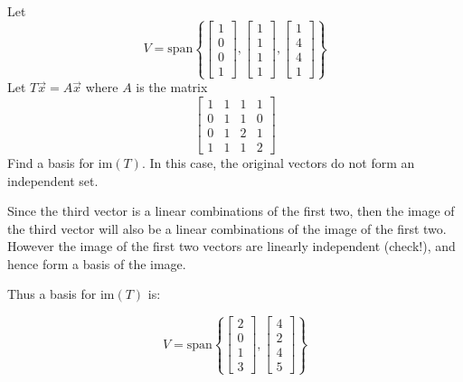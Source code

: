 \documentclass{ximera}
\begin{document}
\begin{problem}\label{prb:10.76} Let
\begin{equation*}
V=\mbox{span}\left\{ \left[
\begin{array}{c}
1 \\
0 \\
0 \\
1
\end{array}
\right] ,\left[
\begin{array}{c}
1 \\
1 \\
1 \\
1
\end{array}
\right] ,\left[
\begin{array}{c}
1 \\
4 \\
4 \\
1
\end{array}
\right] \right\}
\end{equation*}
Let $T\vec{x}=A\vec{x}$ where $A$ is the matrix
\begin{equation*}
\left[
\begin{array}{cccc}
1 & 1 & 1 & 1 \\
0 & 1 & 1 & 0 \\
0 & 1 & 2 & 1 \\
1 & 1 & 1 & 2
\end{array}
\right]
\end{equation*}
Find a basis for $\mbox{im}\left( T\right) $. In this case, the original
vectors do not form an independent set.

\begin{hint}
Since the third vector is a linear combinations of the first two, then
the image of the third vector will also be a linear combinations of
the image of the first two.  However the image of the first two
vectors are linearly independent (check!), and hence form a basis of
the image.

Thus a basis for $\mbox{im}\left( T\right) $ is:

\begin{equation*}
V=\mbox{span}\left\{ \left[
\begin{array}{c}
2 \\
0 \\
1 \\
3
\end{array}
\right] ,\left[
\begin{array}{c}
4 \\
2 \\
4 \\
5
\end{array}
\right]  \right\}
\end{equation*}

\end{hint}
\end{problem}
\end{document}
